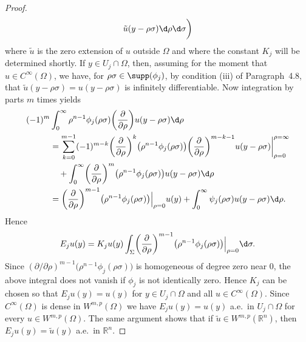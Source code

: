 \begin{proof}
\begin{equation}
\begin{aligned}
        \tilde{u}(y-\rho\sigma) \d\rho\d\sigma\biggr)
    \end{aligned}
  \end{equation}
  where $\tilde{u}$ is the zero extension of $u$ outside $\Omega$
  and where the constant $K_j$ will be determined shortly.
  If $y\in U_j\cap\Omega$, then, assuming for the moment that
  $u\in C^{\infty}(\Omega)$, we have, for $\rho\sigma\in\supp(\phi_j)$,
  by condition (iii) of Paragraph~4.8, that $\tilde{u}(y-\rho\sigma) = u(y-\rho\sigma)$
  is infinitely differentiable. Now integration by parts $m$ times yields
  \begin{align*}
    (-1)^m
    & \int_0^\infty \rho^{n-1} \phi_j(\rho\sigma) \biggl(\frac{\partial}{\partial\rho}\biggr)
      u(y-\rho\sigma) \d\rho \\
    & = \sum_{k=0}^{m-1} (-1)^{m-k} \biggl(\frac{\partial}{\partial\rho}\biggr)^k
      \bigl(\rho^{n-1} \phi_j(\rho\sigma)\bigr)
      \biggl(\frac{\partial}{\partial\rho}\biggr)^{m-k-1} u(y-\rho\sigma)
      \bigg|_{\rho=0}^{\rho=\infty} \\
    & \quad + \int_0^\infty \biggl(\frac{\partial}{\partial\rho}\biggr)^m
      \bigl(\rho^{n-1} \phi_j(\rho\sigma)\bigr) u(y-\rho\sigma) \d\rho \\
    & = \biggl(\frac{\partial}{\partial\rho}\biggr)^{m-1}
      \bigl(\rho^{n-1} \phi_j(\rho\sigma)\bigr)\Big|_{\rho=0} u(y)
      + \int_0^\infty \psi_j(\rho\sigma) u(y-\rho\sigma) \d\rho.
  \end{align*}
  Hence
  \[ E_j u(y) = K_j u(y) \int_{\Sigma} \biggl(\frac{\partial}{\partial\rho}\biggr)^{m-1}
      \bigl(\rho^{n-1} \phi_j(\rho\sigma)\bigr)\Big|_{\rho=0} \d\sigma. \]
  Since $(\partial/\partial\rho)^{m-1} \bigl(\rho^{n-1} \phi_j(\rho\sigma)\bigr)$
  is homogeneous of degree zero near 0, the above integral does not vanish
  if $\phi_j$ is not identically zero. Hence $K_j$ can be chosen
  so that $E_j u(y) = u(y)$ for $y\in U_j\cap\Omega$ and all $u\in C^\infty(\Omega)$.
  Since $C^\infty(\Omega)$ is dense in $W^{m,p}(\Omega)$ we have
  $E_j u(y) = u(y)$ a.e.~in $U_j\cap\Omega$ for every $u\in W^{m,p}(\Omega)$.
  The same argument shows that if $\tilde{u}\in W^{m,p}(\mathbb{R}^n)$,
  then $E_j u(y) = \tilde{u}(y)$ a.e.~in $\mathbb{R}^n$.


\end{proof}
